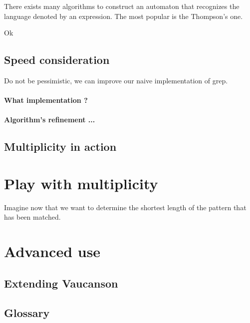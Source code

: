 \documentclass{article}
\begin{document}
There exists many algorithms to construct an automaton that recognizes the language denoted by an expression. The most popular is the Thompson's one.

\begin{code}
Ok
\end{code}

\subsection{Speed consideration}

Do not be pessimistic, we can improve our naive implementation of grep.

\paragraph{What implementation ?}

\paragraph{Algorithm's refinement ...}

\subsection{Multiplicity in action}

\section{Play with multiplicity}

Imagine now that we want to determine the shortest length of the pattern that has been matched.

\section{Advanced use}

\subsection{Extending Vaucanson}

\subsection{Glossary}
\end{document}
